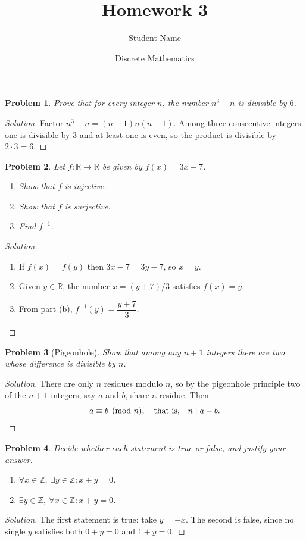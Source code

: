 \documentclass[11pt]{article}
\title{Homework 3}
\author{Student Name}
\date{Discrete Mathematics}
\newtheorem{problem}{Problem}
\newenvironment{solution}{\begin{proof}[Solution]}{\end{proof}}
\newcommand{\Z}{\mathbb{Z}}
\newcommand{\R}{\mathbb{R}}
\begin{document}
\maketitle

\begin{problem}
Prove that for every integer $n$, the number $n^3 - n$ is divisible by $6$.
\end{problem}

\begin{solution}
Factor $n^3 - n = (n-1)n(n+1)$. Among three consecutive integers one is
divisible by $3$ and at least one is even, so the product is divisible by
$2 \cdot 3 = 6$.
\end{solution}

\begin{problem}
Let $f \colon \R \to \R$ be given by $f(x) = 3x - 7$.
\begin{enumerate}[label=(\alph*)]
  \item Show that $f$ is injective.
  \item Show that $f$ is surjective.
  \item Find $f^{-1}$.
\end{enumerate}
\end{problem}

\begin{solution}
\begin{enumerate}[label=(\alph*)]
  \item If $f(x) = f(y)$ then $3x - 7 = 3y - 7$, so $x = y$.
  \item Given $y \in \R$, the number $x = (y+7)/3$ satisfies $f(x) = y$.
  \item From part (b), $f^{-1}(y) = \dfrac{y + 7}{3}$. \qedhere
\end{enumerate}
\end{solution}

\begin{problem}[Pigeonhole]
Show that among any $n + 1$ integers there are two whose difference is
divisible by $n$.
\end{problem}

\begin{solution}
There are only $n$ residues modulo $n$, so by the pigeonhole principle two
of the $n + 1$ integers, say $a$ and $b$, share a residue. Then
\[
  a \equiv b \pmod{n}, \quad\text{that is,}\quad n \mid a - b. \qedhere
\]
\end{solution}

\begin{problem}
Decide whether each statement is true or false, and justify your answer.
\begin{enumerate}[label=\arabic*.]
  \item $\forall x \in \Z,\ \exists y \in \Z : x + y = 0$.
  \item $\exists y \in \Z,\ \forall x \in \Z : x + y = 0$.
\end{enumerate}
\end{problem}

\begin{solution}
The first statement is true: take $y = -x$. The second is false, since no
single $y$ satisfies both $0 + y = 0$ and $1 + y = 0$.
\end{solution}
\end{document}
